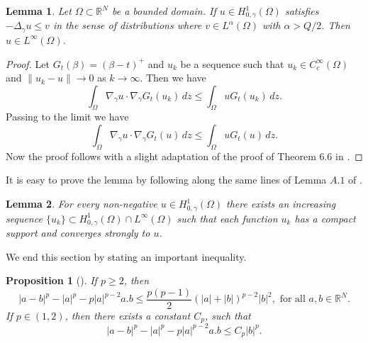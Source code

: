\documentclass[11pt]{article}
\newtheorem{lemma}{Lemma}[section] %
\newtheorem{proposition}{Proposition}[section]
\newcommand{\om} {\Omega}
\newcommand{\rnn}{\mathbb{R}^{N}}
\newcommand{\lv}{\lVert}
\newcommand{\rv}{\rVert}
\newcommand{\Gr}{\Delta_{\gamma}}
\newcommand{\gradgr}{\nabla_{\gamma}}
\newcommand{\spacegr}{H^{1}_{0,\gamma}(\Omega)}
\begin{document}
\begin{lemma}\label{lem:uniform_estimate_grushin}
Let $\om \subset \rnn$ be a bounded domain. If $u \in \spacegr$ satisfies $-\Gr u \leq v$ in the sense of distributions where $v \in L^{\alpha}(\om)$ with $\alpha > Q/2$. Then $u \in L^{\infty}(\om)$.
\end{lemma}
\begin{proof}
Let $G_t(\beta) = (\beta - t)^+$ and $u_k$ be a sequence such that $u_k \in C_c^{\infty}(\om)$ and $\lv u_k -u\rv \to 0$ as $k \to \infty$. Then we have 
\begin{equation*}
\int_{\om} \gradgr u \cdot \gradgr G_t(u_k) \, dz \leq \int_{\om} u G_t(u_k) \, dz.
\end{equation*}
Passing to the limit we have 
\begin{equation*}
\int_{\om} \gradgr u \cdot \gradgr G_t(u) \, dz \leq \int_{\om} u G_t(u) \, dz.
\end{equation*}
Now the proof follows with a slight adaptation of the proof of Theorem $6.6$ in \cite{boccardo_book}.
\end{proof}

It is easy to prove the lemma by following along the same lines of Lemma $A.1$ of \cite{hirano_concave_convex}.
\begin{lemma}\label{lem:density_grushin_space}
For every non-negative $u \in \spacegr$ there exists an increasing sequence $\{ u_k \} \subset \spacegr \cap L^{\infty}(\om)$ such that each function $u_k$ has a compact support and converges strongly to $u$.
\end{lemma}

We end this section by stating an important inequality.

\begin{proposition}[\cite{shafrir2000asymptotic}] \label{ineq:imp_ineq}
    If $p \geq 2$, then $$| a - b|^p -|a|^p - p |a|^{p-2} a.b \leq \frac{p(p-1)}{2}(|a| + |b|)^{p-2}|b|^2, \mbox{ for all } a,b \in \rnn.$$
    If $p \in (1,2)$, then there exists a constant $C_p$, such that
    $$ | a - b|^p -|a|^p - p |a|^{p-2} a.b \leq C_p |b|^p.$$
\end{proposition}
\end{document}
